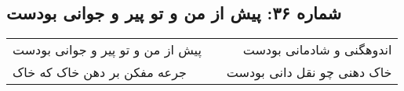 \begin{center}
\section*{شماره ۳۶: پیش از من و تو پیر و جوانی بودست}
\label{sec:036}
\begin{longtable}{l p{0.5cm} r}
پیش از من و تو پیر و جوانی بودست
&&
اندوهگنی و شادمانی بودست
\\
جرعه مفکن بر دهن خاک که خاک
&&
خاک دهنی چو نقل دانی بودست
\\
\end{longtable}
\end{center}
